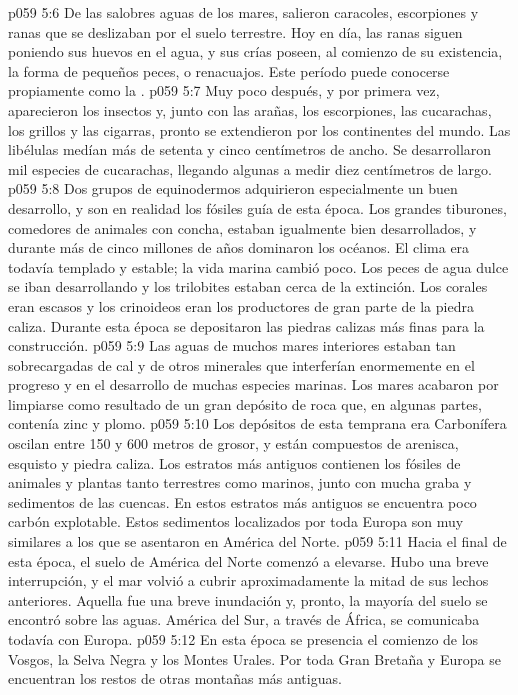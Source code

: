 \vs p059 5:6 De las salobres aguas de los mares, salieron caracoles, escorpiones y ranas que se deslizaban por el suelo terrestre. Hoy en día, las ranas siguen poniendo sus huevos en el agua, y sus crías poseen, al comienzo de su existencia, la forma de pequeños peces, o renacuajos. Este período puede conocerse propiamente como la .
\vs p059 5:7 Muy poco después, y por primera vez, aparecieron los insectos y, junto con las arañas, los escorpiones, las cucarachas, los grillos y las cigarras, pronto se extendieron por los continentes del mundo. Las libélulas medían más de setenta y cinco centímetros de ancho. Se desarrollaron mil especies de cucarachas, llegando algunas a medir diez centímetros de largo.
\vs p059 5:8 Dos grupos de equinodermos adquirieron especialmente un buen desarrollo, y son en realidad los fósiles guía de esta época. Los grandes tiburones, comedores de animales con concha, estaban igualmente bien desarrollados, y durante más de cinco millones de años dominaron los océanos. El clima era todavía templado y estable; la vida marina cambió poco. Los peces de agua dulce se iban desarrollando y los trilobites estaban cerca de la extinción. Los corales eran escasos y los crinoideos eran los productores de gran parte de la piedra caliza. Durante esta época se depositaron las piedras calizas más finas para la construcción.
\vs p059 5:9 Las aguas de muchos mares interiores estaban tan sobrecargadas de cal y de otros minerales que interferían enormemente en el progreso y en el desarrollo de muchas especies marinas. Los mares acabaron por limpiarse como resultado de un gran depósito de roca que, en algunas partes, contenía zinc y plomo.
\vs p059 5:10 Los depósitos de esta temprana era Carbonífera oscilan entre 150 y 600 metros de grosor, y están compuestos de arenisca, esquisto y piedra caliza. Los estratos más antiguos contienen los fósiles de animales y plantas tanto terrestres como marinos, junto con mucha graba y sedimentos de las cuencas. En estos estratos más antiguos se encuentra poco carbón explotable. Estos sedimentos localizados por toda Europa son muy similares a los que se asentaron en América del Norte.
\vs p059 5:11 Hacia el final de esta época, el suelo de América del Norte comenzó a elevarse. Hubo una breve interrupción, y el mar volvió a cubrir aproximadamente la mitad de sus lechos anteriores. Aquella fue una breve inundación y, pronto, la mayoría del suelo se encontró sobre las aguas. América del Sur, a través de África, se comunicaba todavía con Europa.
\vs p059 5:12 En esta época se presencia el comienzo de los Vosgos, la Selva Negra y los Montes Urales. Por toda Gran Bretaña y Europa se encuentran los restos de otras montañas más antiguas.
